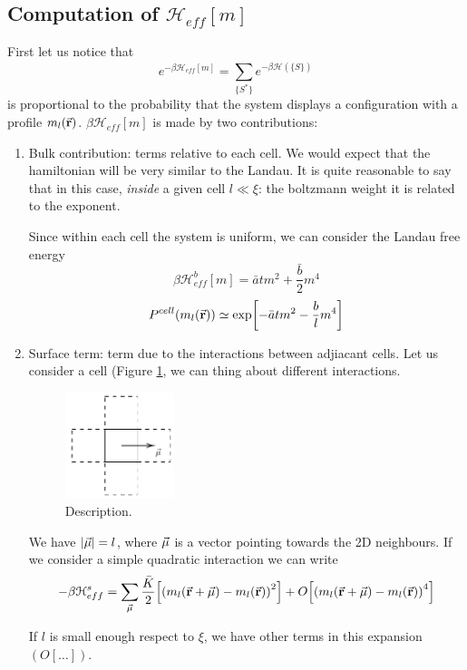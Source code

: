 \documentclass[../main/main.tex]{subfiles}
\begin{document}
\subsection{Computation of \( \mathcal{H}_{eff} [m]\)}
First let us notice that
\begin{equation}
  e^{-\beta \mathcal{H}_{eff} [m]} = \sum_{\{ S^* \}  }^{} e^{-\beta \mathcal{H}( \{ S \}  )}
\end{equation}
is proportional to the probability that the system displays a configuration with a profile \( m_l (\va{r}) \). \( \beta \mathcal{H}_{eff} [m] \) is made by two contributions:

\begin{enumerate}
\item Bulk contribution: terms relative to each cell.
We would expect that the hamiltonian will be very similar to the Landau. It is quite reasonable to say that in this case, \emph{inside}  a given cell \( l \ll \xi  \):
the boltzmann weight it is related to the exponent.

Since within each cell the system is uniform, we can consider the Landau free energy
\begin{equation}
  \beta \mathcal{H}_{eff}^b [m] = \bar{a} t m^2 + \frac{\bar{b} }{2} m^4
\end{equation}
\begin{equation}
  P^{cell} (m_l (\va{r})) \simeq \exp [ - \bar{a} t m^2 - \frac{b}{l} m^4 ]
\end{equation}
\item Surface term: term due to the interactions between adjiacant cells.
Let us consider a cell (Figure \ref{fig:17_2}, we can thing about different interactions.
\begin{figure}[h!]
\centering
\includegraphics[width=0.3\textwidth]{../lessons/17_image/2.pdf}
\caption{\label{fig:17_2} Description.}
\end{figure}
We have \( \abs{\va{\mu }} =l  \), where \( \va{\mu } \) is a vector pointing towards the 2D neighbours. If we consider a simple quadratic interaction we can write
\begin{equation}
  - \beta \mathcal{H}_{eff}^s =   \sum_{\va{\mu }}^{}  \frac{\bar{K} }{2}\qty[ \qty(m_l (\va{r}+\va{\mu }) - m_l(\va{r}))^2] + O \qty[ \qty(m_l (\va{r}+\va{\mu }) - m_l(\va{r}))^4 ]
 \end{equation}
 \begin{remark}
  If \( l \) is small enough respect to \( \xi  \), we have other terms in this expansion \( (O[\dots]) \).
 \end{remark}
\end{enumerate}
\end{document}
